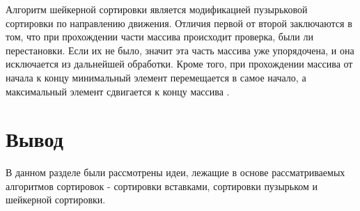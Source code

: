 Алгоритм шейкерной сортировки  является  модификацией  пузырьковой  сортировки  по направлению движения.  Отличия первой от второй заключаются в том, что при прохождении части массива происходит проверка, были ли перестановки. Если их не было, значит эта часть массива уже упорядочена, и она исключается из дальнейшей обработки. Кроме того, при прохождении массива от начала к концу минимальный элемент перемещается в самое начало, а максимальный элемент сдвигается к концу массива \cite{shaker_sort}.


\section*{Вывод}
В данном разделе были рассмотрены идеи, лежащие в основе рассматриваемых алгоритмов сортировок - сортировки вставками, сортировки пузырьком и шейкерной сортировки.
